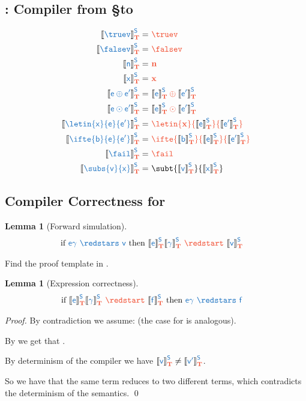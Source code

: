 \documentclass{article}
\newtheorem{lemma}[theorem]{Lemma}
\theoremstyle{definition}
\begin{document}
\subsection{\compgen{\cdot}: Compiler from \S to \T}
\begin{align*}
	\compgen{\truev} = &\ \trg{\truev}
	\\
	\compgen{\falsev} = &\ \trg{\falsev}
	\\
	\compgen{n} = &\ \trg{n}
	\\
	\compgen{x} = &\ \trg{x}
	\\
	\compgen{e \oplus e'} = &\ \trg{\compgen{e} \oplus \compgen{e'}}
	\\
	\compgen{e \odot e'} = &\ \trg{\compgen{e} \odot \compgen{e'}}
	\\
	\compgen{\letin{x}{e}{e'}} = &\ \trg{\letin{x}{\compgen{e}}{\compgen{e'}}}
	\\
	\compgen{\ifte{b}{e}{e'}} = &\ \trg{\ifte{\compgen{b}}{\compgen{e}}{\compgen{e'}}}
	\\
	\compgen{\fail} = &\ \trg{\fail}
	\\
	\compgen{\subs{v}{x}} = &\ \subt{\compgen{v}}{\compgen{x}}  
\end{align*}

\subsection{Compiler Correctness for \compgen{\cdot}}
\begin{lemma}[Forward simulation]\label{thm:fow-sim}
	\begin{align*}
		&
		\text{if } \src{e\gamma\ \redstars\ v}
		\text{ then } \trg{\compgen{e}\compgen{\gamma}\ \redstart\ \compgen{v}}
	\end{align*}
\end{lemma}
Find the proof template in .

\begin{lemma}[Expression correctness]\label{thm:expr-corr}
	\begin{align*}
		&
		\text{if }\trg{\compgen{e}\compgen{\gamma}\ \redstart\ \compgen{f}}
		\text{ then }\src{e\gamma\ \redstars\ f}
	\end{align*}
\end{lemma}
\begin{proof}
	By contradiction we assume:  (the case for  is analogous).

	By  we get that .

	By determinism of the compiler we have $\compgen{v}\neq\compgen{v'}$.

	So we have that the same term  reduces to two different terms, which contradicts the determinism of the semantics.
	\qed
\end{proof}
\end{document}
